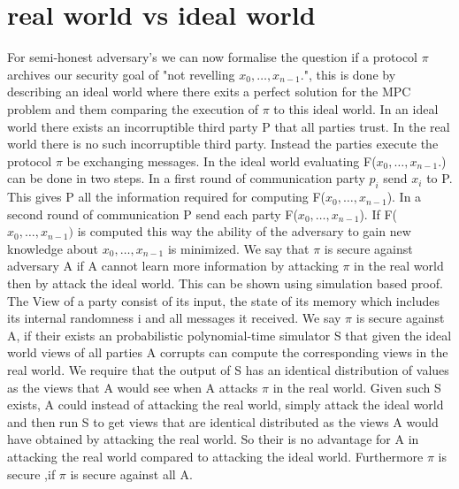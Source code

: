 \section{real world vs ideal world }
For semi-honest adversary's we can now formalise the question if a protocol $ \pi $ archives our security goal of "not revelling $ x_0,\dots,x_{n-1}. $", this is done by describing an ideal world where there exits a perfect solution for the MPC problem and them comparing the execution of $ \pi $ to this ideal world. In an ideal world there exists an incorruptible third party P that all parties trust. In the real world there is no such incorruptible third party. Instead the parties execute the protocol $ \pi $ be exchanging messages.
In the ideal world evaluating F($ x_0,\dots,x_{n-1}. $) can be done in two steps. In a first round of communication party $ p_i $ send $x_i $ to P.
This gives P all the information required for computing F($ x_0,\dots,x_{n-1} $). In a second round of communication P send each party F($ x_0,\dots,x_{n-1} $).
If F($ x_0,\dots,x_{n-1}) $ is computed this way the ability of the adversary to gain new knowledge about $ x_0,\dots,x_{n-1} $ is minimized. We say that  $ \pi $ is secure against adversary A if A cannot learn more information by attacking $ \pi $ in the real world then by attack the ideal world. This can be shown using simulation based proof. 
The View of a party consist of its input, the state of its memory which includes its internal randomness i and all messages it received. 
We say $ \pi $ is secure against A,  if their exists an probabilistic polynomial-time simulator S that given the ideal world views of all parties A corrupts can compute the corresponding views in the real world. We require that the output of S has an identical distribution of values as the views that A would see when A attacks $ \pi $ in the real world. Given such S exists, A could instead of attacking the real world, simply attack the ideal world and then run S to get views that are identical distributed as the views A would have obtained by attacking the real world. So their is no advantage for A in attacking the real world compared to attacking the ideal world. Furthermore $ \pi $ is secure ,if $ \pi $ is secure against all A.       
      

